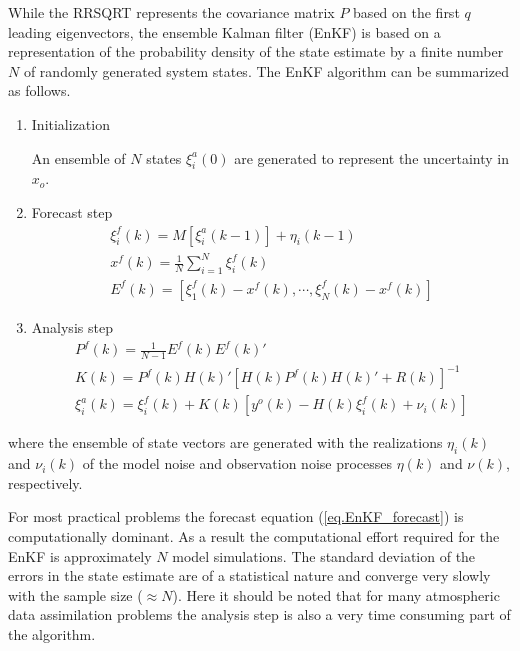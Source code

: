 \documentclass[a4paper,12pt]{article}
\begin{document}
      While the RRSQRT represents the covariance matrix $P$ based on the first
      $q$ leading eigenvectors, the ensemble Kalman filter (EnKF) is based on a
      representation of the probability density of the state estimate by a
      finite number $N$ of randomly generated system states. The EnKF algorithm
      can be summarized as follows.

       \begin{enumerate}
        \item Initialization
              
              An ensemble of $N$ states $\xi^a_i(0)$ are generated to represent the uncertainty in $x_o$.

        \item Forecast step
              \begin{eqnarray}
               \xi_i^f(k)=M[\xi_i^a(k-1)] + \eta_i(k-1) \label{eq.EnKF_forecast} \\
               x^f(k)=\frac{1}{N} \sum_{i=1}^N \xi_i^f(k) \\
               E^f(k)=[\xi_1^f(k)-x^f(k),\cdots,\xi_N^f(k)-x^f(k)]
              \end{eqnarray}

        \item Analysis step
              \begin{eqnarray}
                P^f(k)=\frac{1}{N-1}E^f(k)E^f(k)' \\
                K(k) = P^f(k)H(k)'[H(k)P^f(k)H(k)'+R(k)]^{-1} \\
                \xi^a_i(k) = \xi^f_i(k) + K(k) [y^o(k) - H(k) \xi^f_i(k) + \nu_i(k)]
              \end{eqnarray}
       \end{enumerate}
       where the ensemble of state vectors are generated with the realizations
       $\eta_i(k)$ and $\nu_i(k)$ of the model noise and observation noise
       processes $\eta(k)$ and $\nu(k)$, respectively.

       For most practical problems the forecast equation
       (\ref{eq.EnKF_forecast}) is computationally dominant. As a result the
       computational effort required for the EnKF is approximately $N$ model
       simulations. The standard deviation of the errors in the state estimate
       are of a statistical nature and converge very slowly with the sample
       size ($\approx N$). Here it should be noted that for many atmospheric
       data assimilation problems the analysis step is also a very time
       consuming part of the algorithm.
\end{document}
